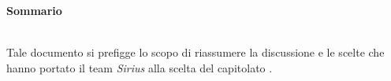 \noindent\begin{Large}\textbf{Sommario}\end{Large}\\
\noindent Tale documento si prefigge lo scopo di riassumere la discussione e le scelte che hanno portato il team \textit{Sirius} alla scelta del capitolato \progetto.\\

